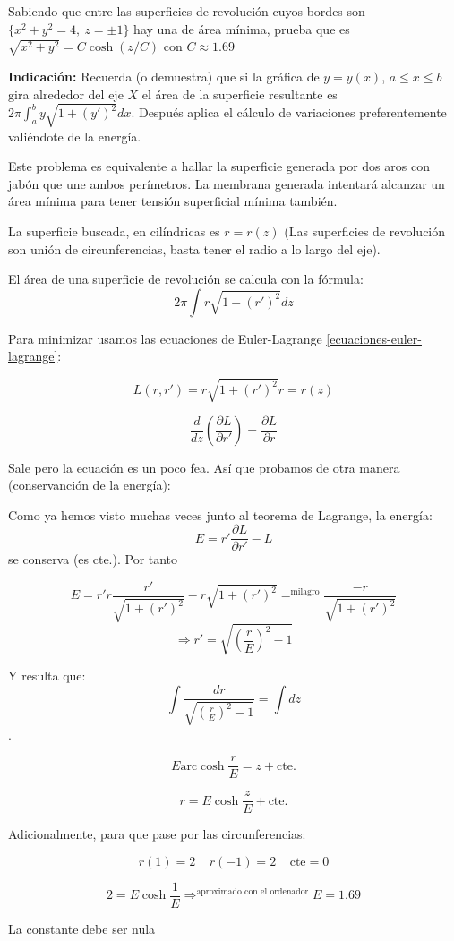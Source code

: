\begin{problem}[14]
Sabiendo que entre las superficies de revolución cuyos bordes son $\{x^2+y^2 = 4, \ z= \pm 1\}$ hay una de área mínima, prueba que es $\sqrt{x^2+y^2}=C\cosh(z/C)$ con $C \approx 1.69$

\textbf{Indicación:} Recuerda (o demuestra) que si la gráfica de $y=y(x)$, $a\leq x \leq b$ gira alrededor del eje $X$ el área de la superficie resultante es $2\pi \int_a^by\sqrt{1+(y')^2}dx$. Después aplica el cálculo de variaciones preferentemente valiéndote de la energía.
\solution

Este problema es equivalente a hallar la superficie generada por dos aros con jabón que une ambos perímetros. La membrana generada intentará alcanzar un área mínima para tener tensión superficial mínima también.

La superficie buscada, en cilíndricas es $r = r(z)$ (Las superficies de revolución son unión de circunferencias, basta tener el radio a lo largo del eje).

El área de una superficie de revolución se calcula con la fórmula:
\[ 2\pi \int r\sqrt{1+(r')^2}dz  \]

Para minimizar usamos las ecuaciones de Euler-Lagrange \ref{ecuaciones-euler-lagrange}:

$$ L (r, r') = r \sqrt{1+(r')^2} r = r(z)$$

$$\frac{d}{dz} \left( \frac{\partial L}{\partial r'} \right) = \frac{\partial L}{\partial r} $$

Sale pero la ecuación es un poco fea. Así que probamos de otra manera (conservanción de la energía):

Como ya hemos visto muchas veces junto al teorema de Lagrange, la energía:
\[E = r' \frac{\partial L}{\partial r'} - L \]
se conserva (es cte.). Por tanto

$$ E = r' r \frac{r'}{\sqrt{1 + (r')^2}} - r \sqrt{1 + (r')^2} =^{\text{milagro}} \frac{-r}{\sqrt{1 + (r')^2}} $$
$$ \Rightarrow r' = \sqrt{\left( \frac{r}{E} \right)^2 - 1}  $$

Y resulta que:
$$ \int \frac{dr}{\sqrt{\left( \frac{r}{E} \right)^2 - 1}} = \int dz $$.

$$ E \text{arc}\cosh{\frac{r}{E}} = z + \text{cte.} $$

$$ r = E \cosh{\frac{z}{E} + \text{cte.}} $$

Adicionalmente, para que pase por las circunferencias:

$$ r(1) = 2 \;\;\;\; r(-1) = 2 \;\;\;\; \text{cte} = 0 $$

$$ 2 = E \cosh{\frac{1}{E}} \Rightarrow^{\text{aproximado con el ordenador}} E = 1.69 $$


La constante debe ser nula

\end{problem}


